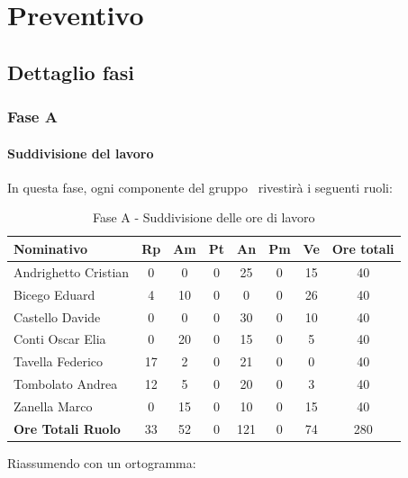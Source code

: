 \documentclass[../PianoProgetto.tex]{subfiles}
\begin{document}
	\section{Preventivo}
		\subsection{Dettaglio fasi}
			\subsubsection{Fase A}
				\paragraph{Suddivisione del lavoro}
					In questa fase, ogni componente del gruppo \leaf\ rivestirà i seguenti ruoli:
	
	\begin{table}[h]
		\begin{tabularx}{\textwidth}{l  * {6}{C}  c}
			\toprule
			\textbf{Nominativo} & \textbf{Rp} & \textbf{Am} & \textbf{Pt} 
						& \textbf{An} & \textbf{Pm} & \textbf{Ve} & \textbf{Ore totali} \\
			\midrule
			Andrighetto Cristian & 0 & 0 &	0 &	25 & 0 & 15 & 40 \\
			Bicego Eduard & 4 & 10 & 0 & 0 & 0 & 26 & 40 \\
			Castello Davide &	0 &	0 &	0 &	30 & 0 &	10 & 40 \\
			Conti Oscar Elia & 0 & 20 &	0 &	15 & 0 & 5 & 40 \\
			Tavella Federico &	17 & 2 & 0 & 21 & 0 & 0 & 40 \\
			Tombolato Andrea & 12 & 5 &	0 &	20 & 0 & 3 & 40 \\
			Zanella Marco & 0 & 15 & 0 & 10 & 0 & 15 & 40 \\
			\midrule			
			\textbf{Ore Totali Ruolo} & 33 & 52 & 0 & 121 &	0 &	74 & 280 \\
			\bottomrule
		\end{tabularx}
		\caption{Fase A - Suddivisione delle ore di lavoro}
		\label{tab:faseA_ore}
	\end{table}

\vfill
Riassumendo con un ortogramma:	
	
\end{document}
